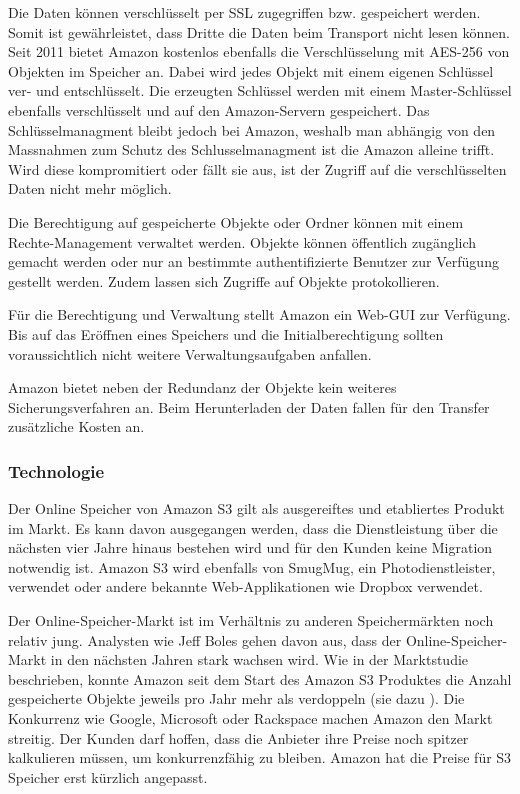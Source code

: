 Die Daten können verschlüsselt per SSL zugegriffen bzw. gespeichert werden. Somit ist gewährleistet, dass Dritte die Daten beim Transport nicht lesen können. Seit 2011 bietet Amazon kostenlos ebenfalls die Verschlüsselung mit AES-256 von Objekten im Speicher an. Dabei wird jedes Objekt mit einem eigenen Schlüssel ver- und entschlüsselt. Die erzeugten Schlüssel werden mit einem Master-Schlüssel ebenfalls verschlüsselt und auf den Amazon-Servern gespeichert. Das Schlüsselmanagment bleibt jedoch bei Amazon, weshalb man abhängig von den Massnahmen zum Schutz des Schlusselmanagment ist die Amazon alleine trifft. Wird diese kompromitiert oder fällt sie aus, ist der Zugriff auf die verschlüsselten Daten nicht mehr möglich.\cite{RobertLippert2011}

Die Berechtigung auf gespeicherte Objekte oder Ordner können mit einem Rechte-Management verwaltet werden. Objekte können öffentlich zugänglich gemacht werden oder nur an bestimmte authentifizierte Benutzer zur Verfügung gestellt werden. Zudem lassen sich Zugriffe auf Objekte protokollieren.\cite{Amazon2012b}

Für die Berechtigung und Verwaltung stellt Amazon ein Web-GUI zur Verfügung. Bis auf das Eröffnen eines Speichers und die Initialberechtigung sollten voraussichtlich nicht weitere Verwaltungsaufgaben anfallen.

Amazon bietet neben der Redundanz der Objekte kein weiteres Sicherungsverfahren an. Beim Herunterladen der Daten fallen für den Transfer zusätzliche Kosten an.

\subsubsection*{Technologie}
Der Online Speicher von Amazon S3 gilt als ausgereiftes und etabliertes Produkt im Markt. Es kann davon ausgegangen werden, dass die Dienstleistung über die nächsten vier Jahre hinaus bestehen wird und für den Kunden keine Migration notwendig ist. Amazon S3 wird ebenfalls von SmugMug, ein Photodienstleister, verwendet oder andere bekannte Web-Applikationen wie Dropbox verwendet.\cite{SmugMug}\cite{Dropbox2011}

Der Online-Speicher-Markt ist im Verhältnis zu anderen Speichermärkten noch relativ jung. Analysten wie Jeff Boles gehen davon aus, dass der Online-Speicher-Markt in den nächsten Jahren stark wachsen wird. Wie in der Marktstudie beschrieben, konnte Amazon seit dem Start des Amazon S3 Produktes die Anzahl gespeicherte Objekte jeweils pro Jahr mehr als verdoppeln (sie dazu ). Die Konkurrenz wie Google, Microsoft oder Rackspace machen Amazon den Markt streitig. Der Kunden darf hoffen, dass die Anbieter ihre Preise noch spitzer kalkulieren müssen, um konkurrenzfähig zu bleiben. Amazon hat die Preise für S3 Speicher erst kürzlich angepasst.\cite{Boles2011}\cite{Barr2012a}


